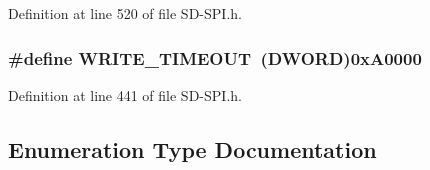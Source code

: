 Definition at line 520 of file S\+D-\/\+S\+P\+I.\+h.

\hypertarget{_s_d-_s_p_i_8h_a3af75bd8417b347229705d6d522ad5c3}{}
\subsubsection[{W\+R\+I\+T\+E\+\_\+\+T\+I\+M\+E\+O\+U\+T}]{\setlength{\rightskip}{0pt plus 5cm}\#define W\+R\+I\+T\+E\+\_\+\+T\+I\+M\+E\+O\+U\+T~({\bf D\+W\+O\+R\+D})0x\+A0000}\label{_s_d-_s_p_i_8h_a3af75bd8417b347229705d6d522ad5c3}


Definition at line 441 of file S\+D-\/\+S\+P\+I.\+h.



\subsection{Enumeration Type Documentation}
\hypertarget{_s_d-_s_p_i_8h_a69658e0ba42c5888b733c1ef68ae5187}{}
